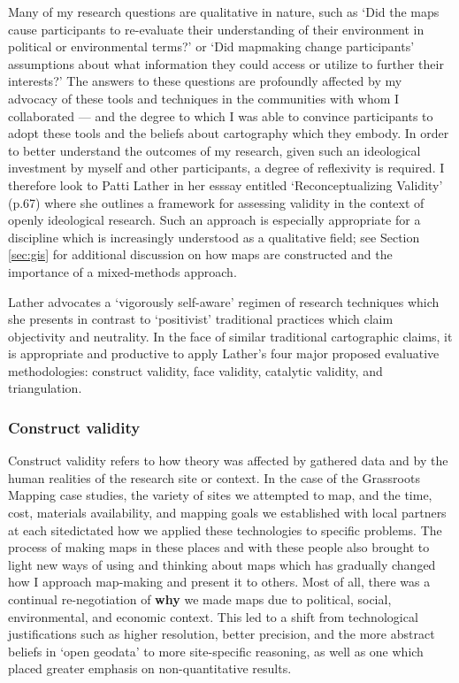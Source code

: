 \documentclass[11pt]{report}
\begin{document}
Many of my research questions are qualitative in nature, such as `Did the maps cause participants to re-evaluate their understanding of their environment in political or environmental terms?' or `Did mapmaking change participants' assumptions about what information they could access or utilize to further their interests?' The answers to these questions are profoundly affected by my advocacy of these tools and techniques in the communities with whom I collaborated --- and the degree to which I was able to convince participants to adopt these tools and the beliefs about cartography which they embody. In order to better understand the outcomes of my research, given such an ideological investment by myself and other participants, a degree of reflexivity is required. I therefore look to Patti Lather in her esssay entitled `Reconceptualizing Validity' (p.67) where she outlines a framework for assessing validity in the context of openly ideological research. Such an approach is especially appropriate for a discipline which is increasingly understood as a qualitative field; see Section \ref{sec:gis} for additional discussion on how maps are constructed and the importance of a mixed-methods approach. 

Lather advocates a `vigorously self-aware' regimen of research techniques which she presents in contrast to `positivist' traditional practices which claim objectivity and neutrality. In the face of similar traditional cartographic claims, it is appropriate and productive to apply Lather's four major proposed evaluative methodologies: construct validity, face validity, catalytic validity, and triangulation. 

\subsubsection{Construct validity}

Construct validity refers to how theory was affected by gathered data and by the human realities of the research site or context. In the case of the Grassroots Mapping case studies, the variety of sites we attempted to map, and the time, cost, materials availability, and mapping goals we established with local partners at each sitedictated how we applied these technologies to specific problems. The process of making maps in these places and with these people also brought to light new ways of using and thinking about maps which has gradually changed how I approach map-making and present it to others. Most of all, there was a continual re-negotiation of \textbf{why} we made maps due to political, social, environmental, and economic context. This led to a shift from technological justifications such as higher resolution, better precision, and the more abstract beliefs in `open geodata' to more site-specific reasoning, as well as one which placed greater emphasis on non-quantitative results.  
\end{document}
